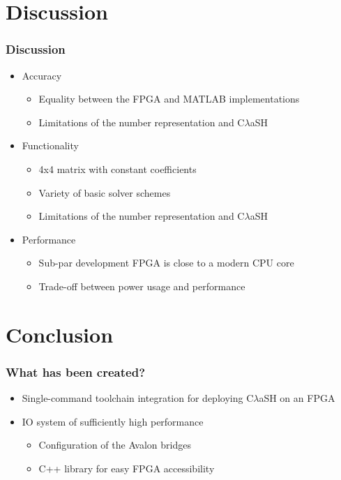 \documentclass{beamer}[10]
\newcommand{\clash}{C$\lambda$aSH}
\newcommand{\matlab}{MATLAB}
\begin{document}
\section{Discussion}
\begin{frame}
	\frametitle{Discussion}
	\begin{itemize}
		\item Accuracy 
		\begin{itemize}
			\item Equality between the FPGA and \matlab{} implementations
			\item Limitations of the number representation and \clash{}
		\end{itemize}
		
		\item Functionality 
		\begin{itemize}
			\item 4x4 matrix with constant coefficients
			\item Variety of basic solver schemes
			\item Limitations of the number representation and \clash{}
		\end{itemize}
		
		\item Performance 
		\begin{itemize}
			\item Sub-par development FPGA is close to a modern CPU core
			\item Trade-off between power usage and performance
		\end{itemize}
		
	\end{itemize}
\end{frame}


\section{Conclusion}
\begin{frame}
	\frametitle{What has been created?}
	\begin{itemize}
		\item Single-command toolchain integration for deploying \clash{} on an FPGA
		\item IO system of sufficiently high performance
		\begin{itemize}
			\item Configuration of the Avalon bridges
			\item C++ library for easy FPGA accessibility
		\end{itemize}	
	\end{itemize}
\end{frame}	
\end{document}
